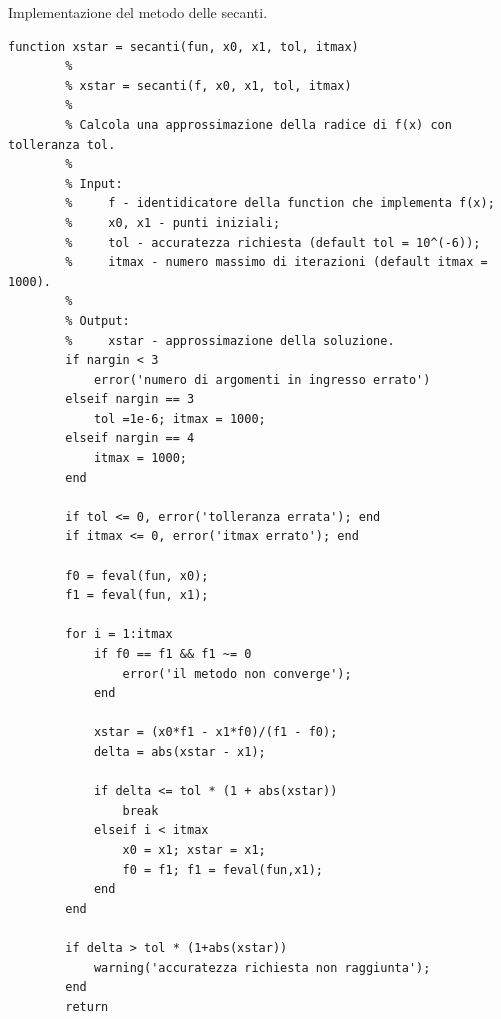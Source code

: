 \begin{algorithm}
	\caption{Implementazione del metodo delle secanti.}\label{alg:metodo_secanti}
	\begin{lstlisting}[style=Matlab-editor]
		function xstar = secanti(fun, x0, x1, tol, itmax)
		% 
		% xstar = secanti(f, x0, x1, tol, itmax)
		% 
		% Calcola una approssimazione della radice di f(x) con tolleranza tol.
		% 
		% Input:
		%     f - identidicatore della function che implementa f(x);
		%     x0, x1 - punti iniziali;
		%     tol - accuratezza richiesta (default tol = 10^(-6));
		%     itmax - numero massimo di iterazioni (default itmax = 1000).
		% 
		% Output:
		%     xstar - approssimazione della soluzione.
		if nargin < 3
			error('numero di argomenti in ingresso errato')
		elseif nargin == 3
			tol =1e-6; itmax = 1000;
		elseif nargin == 4
			itmax = 1000;
		end
		
		if tol <= 0, error('tolleranza errata'); end
		if itmax <= 0, error('itmax errato'); end
		
		f0 = feval(fun, x0);
		f1 = feval(fun, x1);
		
		for i = 1:itmax
			if f0 == f1 && f1 ~= 0
				error('il metodo non converge');
			end
			
			xstar = (x0*f1 - x1*f0)/(f1 - f0);
			delta = abs(xstar - x1);
			
			if delta <= tol * (1 + abs(xstar))
				break
			elseif i < itmax
				x0 = x1; xstar = x1;
				f0 = f1; f1 = feval(fun,x1);
			end
		end
		
		if delta > tol * (1+abs(xstar))
			warning('accuratezza richiesta non raggiunta');
		end
		return
	\end{lstlisting}
\end{algorithm}